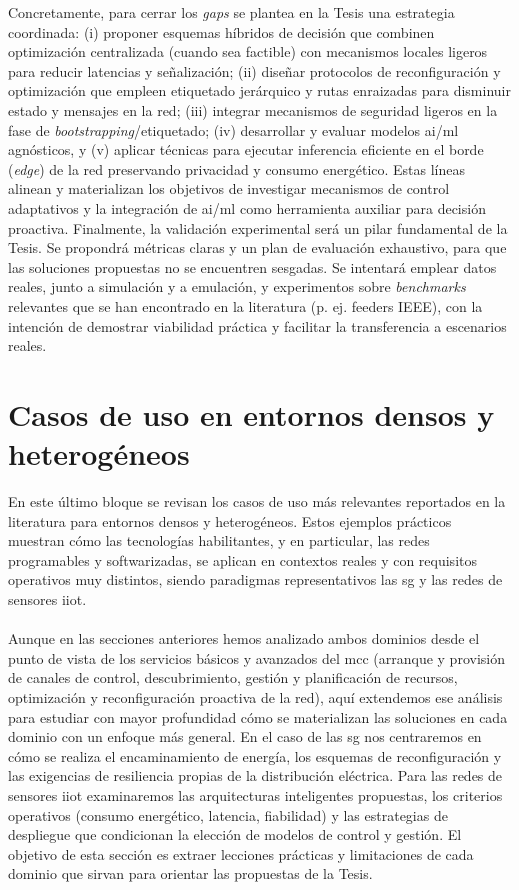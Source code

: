 Concretamente, para cerrar los \emph{gaps} se plantea en la Tesis una estrategia coordinada: (i) proponer esquemas híbridos de decisión que combinen optimización centralizada (cuando sea factible) con mecanismos locales ligeros para reducir latencias y señalización; (ii) diseñar protocolos de reconfiguración y optimización que empleen etiquetado jerárquico y rutas enraizadas para disminuir estado y mensajes en la red; (iii) integrar mecanismos de seguridad ligeros en la fase de \textit{bootstrapping}/etiquetado; (iv) desarrollar y evaluar modelos \gls{ai}/\gls{ml} agnósticos, y (v) aplicar técnicas para ejecutar inferencia eficiente en el borde (\textit{edge}) de la red preservando privacidad y consumo energético. Estas líneas alinean y materializan los objetivos de investigar mecanismos de control adaptativos y la integración de \gls{ai}/\gls{ml} como herramienta auxiliar para decisión proactiva. Finalmente, la validación experimental será un pilar fundamental de la Tesis. Se propondrá métricas claras y un plan de evaluación exhaustivo, para que las soluciones propuestas no se encuentren sesgadas. Se intentará emplear datos reales, junto a simulación y a  emulación, y experimentos sobre \textit{benchmarks} relevantes que se han encontrado en la literatura (p. ej. feeders IEEE), con la intención de demostrar viabilidad práctica y facilitar la transferencia a escenarios reales. 




\section{Casos de uso en entornos densos y heterogéneos}  
\label{sec:casos_de_uso}

En este último bloque se revisan los casos de uso más relevantes reportados en la literatura para entornos densos y heterogéneos. Estos ejemplos prácticos muestran cómo las tecnologías habilitantes, y en particular, las redes programables y softwarizadas, se aplican en contextos reales y con requisitos operativos muy distintos, siendo paradigmas representativos las \gls{sg} y las redes de sensores \gls{iiot}.\\
\\
Aunque en las secciones anteriores hemos analizado ambos dominios desde el punto de vista de los servicios básicos y avanzados del \gls{mcc} (arranque y provisión de canales de control, descubrimiento, gestión y planificación de recursos, optimización y reconfiguración proactiva de la red), aquí extendemos ese análisis para estudiar con mayor profundidad cómo se materializan las soluciones en cada dominio con un enfoque más general. En el caso de las \gls{sg} nos centraremos en cómo se realiza el encaminamiento de energía, los esquemas de reconfiguración y las exigencias de resiliencia propias de la distribución eléctrica. Para las redes de sensores \gls{iiot} examinaremos las arquitecturas inteligentes propuestas, los criterios operativos (consumo energético, latencia, fiabilidad) y las estrategias de despliegue que condicionan la elección de modelos de control y gestión. El objetivo de esta sección es extraer lecciones prácticas y limitaciones de cada dominio que sirvan para orientar las propuestas de la Tesis.



